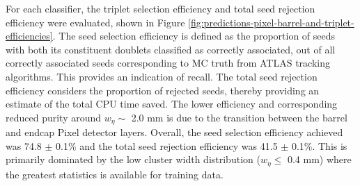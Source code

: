 For each classifier, the triplet selection efficiency and total seed rejection efficiency were evaluated, shown in Figure \ref{fig:predictions-pixel-barrel-and-triplet-efficiencies}. The seed selection efficiency is defined as the proportion of seeds with both its constituent doublets classified as correctly associated, out of all correctly associated seeds corresponding to MC truth from ATLAS tracking algorithms. This provides an indication of recall. The total seed rejection efficiency considers the proportion of rejected seeds, thereby providing an estimate of the total CPU time saved. The lower efficiency and corresponding reduced purity around $w_{\eta} \sim$ 2.0 mm is due to the transition between the barrel and endcap Pixel detector layers. Overall, the seed selection efficiency achieved was 74.8 $\pm$ 0.1\% and the total seed rejection efficiency was 41.5 $\pm$ 0.1\%. This is primarily dominated by the low cluster width distribution ($w_{\eta} \leq$ 0.4 mm) where the greatest statistics is available for training data.




